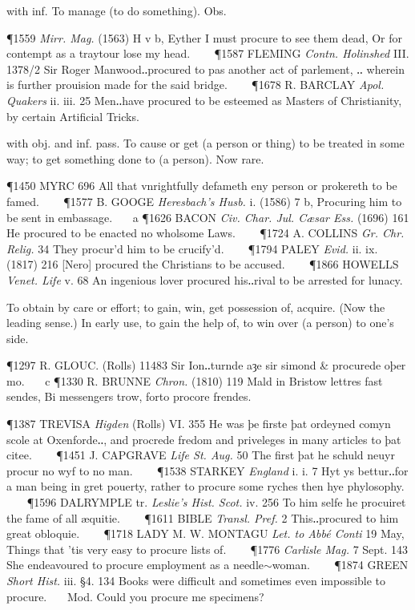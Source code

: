 \begin{description}[wide, labelwidth=!, labelindent=0pt]
\begin{myenumerate}
 with inf. To manage (to do something). Obs.

\P 1559  \textit{Mirr. Mag.} (1563) H v b, Eyther I must procure to see them dead, Or for contempt as a traytour lose my head.    
\P 1587 FLEMING  \textit{Contn. Holinshed} III. 1378/2 Sir Roger Manwood‥procured to pas another act of parlement, ‥ wherein is further prouision made for the said bridge.    
\P 1678 R. BARCLAY  \textit{Apol. Quakers} ii. iii. 25 Men‥have procured to be esteemed as Masters of Christianity, by certain Artificial Tricks.

 with obj. and inf. pass. To cause or get (a person or thing) to be treated in some way; to get something done to (a person). Now rare.

\P 1450 MYRC  696 All that vnrightfully defameth eny person or prokereth to be famed.    
\P 1577 B. GOOGE  \textit{Heresbach's Husb.} i. (1586) 7 b, Procuring him to be sent in embassage.    a 
\P 1626 BACON  \textit{Civ. Char. Jul. Cæsar Ess.} (1696) 161 He procured to be enacted no wholsome Laws.    
\P 1724 A. COLLINS  \textit{Gr. Chr. Relig.} 34 They procur'd him to be crucify'd.    
\P 1794 PALEY  \textit{Evid.} ii. ix. (1817) 216 [Nero] procured the Christians to be accused.    
\P 1866 HOWELLS  \textit{Venet. Life} v. 68 An ingenious lover procured his‥rival to be arrested for lunacy.

 To obtain by care or effort; to gain, win, get possession of, acquire. (Now the leading sense.) In early use, to gain the help of, to win over (a person) to one's side.

\P 1297 R. GLOUC.  (Rolls) 11483 Sir Ion‥turnde  aȝe sir simond \& procurede oþer mo.    c 
\P 1330 R. BRUNNE  \textit{Chron.} (1810) 119 Mald in Bristow lettres fast sendes, Bi messengers trow, forto procore frendes.

\P 1387 TREVISA  \textit{Higden} (Rolls) VI. 355 He was þe firste þat ordeyned comyn scole at Oxenforde‥, and procrede fredom and priveleges in many articles to þat citee.    
\P 1451 J. CAPGRAVE  \textit{Life St. Aug.} 50 The first þat he schuld neuyr procur no wyf to no man.    
\P 1538 STARKEY  \textit{England} i. i. 7 Hyt ys bettur‥for a man being in gret pouerty, rather to procure some ryches then hye phylosophy.    
\P 1596 DALRYMPLE tr.  \textit{Leslie's Hist. Scot.} iv. 256 To him selfe he procuiret the fame of all æquitie.    
\P 1611 BIBLE  \textit{Transl. Pref.} 2 This‥procured to him great obloquie.    
\P 1718 LADY  M. W. MONTAGU \textit{Let. to Abbé Conti} 19 May, Things that 'tis very easy to procure lists of.    
\P 1776 \textit{Carlisle  Mag.} 7 Sept. 143 She endeavoured to procure employment as a needle$\sim$woman.    
\P 1874 GREEN  \textit{Short Hist.} iii. §4. 134 Books were difficult and sometimes even impossible to procure.    Mod. Could you procure me specimens?


\end{myenumerate}
\end{description}
